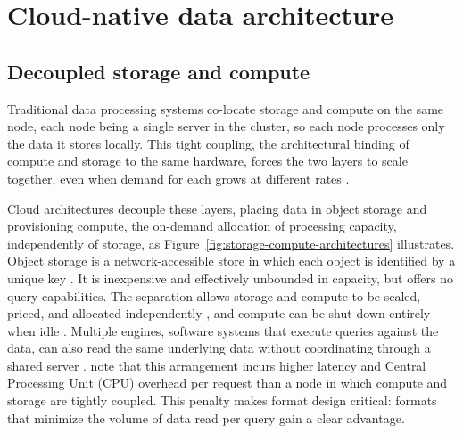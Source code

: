 \section{Cloud-native data architecture}
\label{background:cloud-native-data-architecture}
\subsection{Decoupled storage and compute} 
\label{background:cloud-native-data-architecture:decoupled-storage-and-compute}
Traditional data processing systems co-locate storage and compute on the same node, each node being a single server in the cluster, so each node processes only the data it stores locally. This tight coupling, the architectural binding of compute and storage to the same hardware, forces the two layers to scale together, even when demand for each grows at different rates \parencite{dageville2016_snowflake_elastic_data_warehouse}.

Cloud architectures decouple these layers, placing data in object storage and provisioning compute, the on-demand allocation of processing capacity, independently of storage, as Figure~\ref{fig:storage-compute-architectures} illustrates. Object storage is a network-accessible store in which each object is identified by a unique key \parencite{calder2011_windows_azure_storage,mesnier2003_object_based_storage}. It is inexpensive and effectively unbounded in capacity, but offers no query capabilities. The separation allows storage and compute to be scaled, priced, and allocated independently \parencite{pang2024_storage_disaggregated_databases}, and compute can be shut down entirely when idle \parencite{dageville2016_snowflake_elastic_data_warehouse}. Multiple engines, software systems that execute queries against the data, can also read the same underlying data without coordinating through a shared server \parencite{pang2024_storage_disaggregated_databases}. \textcite{dageville2016_snowflake_elastic_data_warehouse} note that this arrangement incurs higher latency and Central Processing Unit (CPU) overhead per request than a node in which compute and storage are tightly coupled. This penalty makes format design critical: formats that minimize the volume of data read per query gain a clear advantage.

